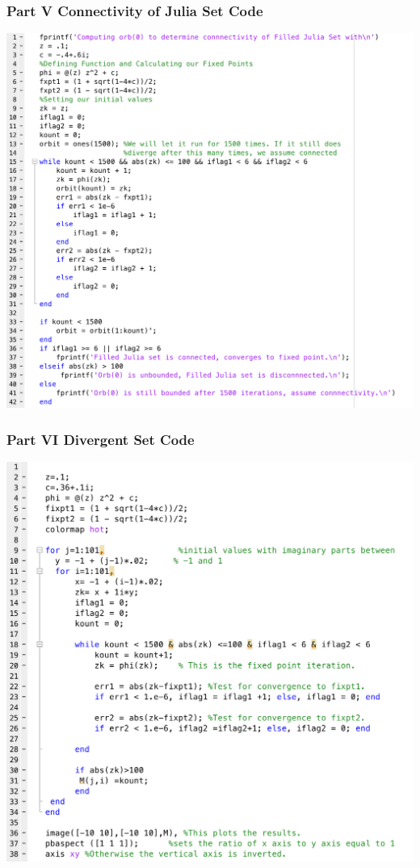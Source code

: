 \documentclass[11pt]{article}
\theoremstyle{plain}
\theoremstyle{definition}
\begin{document}
\subsubsection*{Part V Connectivity of Julia Set Code}
\includegraphics*[scale = 0.35]{Part5Code.png}
\subsubsection*{Part VI Divergent Set Code}
\includegraphics*[scale = 0.35]{Part6Code.png}
\end{document}
